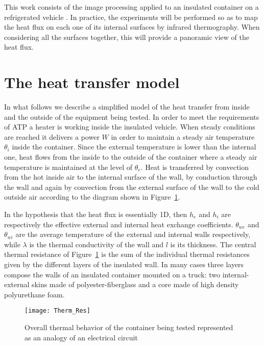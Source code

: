 \documentclass{tQRT2e}
\begin{document}
This work consists of the image processing applied to an insulated container on a refrigerated vehicle \cite{bison1993automatic,bison2012geometrical}. In practice, the experiments will be performed so as to map the heat flux on each one of its internal surfaces by infrared thermography. When considering all the surfaces together, this will provide a panoramic view of the heat flux.


\section{The heat transfer model}

In what follows we describe a simplified model of the heat transfer from inside and the outside of the equipment being tested. In order to meet the requirements of ATP a heater is working inside the insulated vehicle. When steady conditions are reached it delivers a power $ W $ in order to maintain a steady air temperature $ \theta_i $ inside the container. Since the external temperature is lower than the internal one, heat flows from the inside to the outside of the container where a steady air temperature is maintained at the level of $ \theta_e $. Heat is transferred by convection from the hot inside air to the internal surface of the wall, by conduction through the wall and again by convection from the external surface of the wall to the cold outside air according to the diagram shown in Figure~\ref{Therm_Res}. 

In the hypothesis that the heat flux is essentially 1D,  then $ h_e $ and $ h_i $ are respectively the effective external and internal heat exchange coefficients. $ \theta_{we} $ and $ \theta_{wi} $ are the average temperature of the external and internal walls respectively, while $\lambda $ is the thermal conductivity of the wall and $l$ is its thickness. The central thermal resistance of Figure~\ref{Therm_Res} is the sum of the individual thermal resistances given by the different layers of the insulated wall. In many cases three layers compose the walls of an insulated container mounted on a truck: two internal-external skins made of polyester-fiberglass and a core made of high density polyurethane foam.
\begin{figure}[ht]
	\centering
	\texttt{[image: Therm\_Res]}
	\caption{Overall thermal behavior of the container being tested represented as an analogy of an electrical circuit}
	\label{Therm_Res}
\end{figure}
\end{document}
